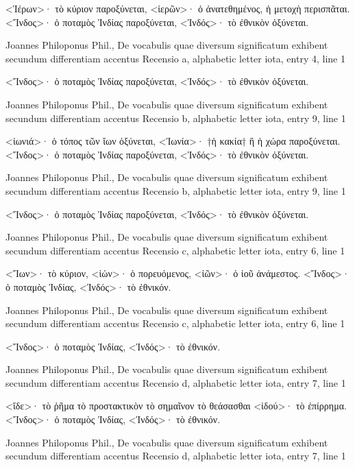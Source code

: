 \documentclass[12pt,letterpaper,twoside,final]{memoir}
\begin{document}
\begin{greek}
<Ἱέρων>· τὸ κύριον παροξύνεται, 
<ἱερῶν>· ὁ ἀνατεθημένος, ἡ μετοχὴ περισπᾶται. 
<Ἴνδος>· ὁ ποταμὸς Ἰνδίας παροξύνεται, 
<Ἰνδός>· τὸ ἐθνικὸν ὀξύνεται. 



Joannes Philoponus Phil., De vocabulis quae diversum significatum exhibent secundum differentiam accentus 
Recensio a, alphabetic letter iota, entry 4, line 1

<Ἴνδος>· ὁ ποταμὸς Ἰνδίας παροξύνεται, 
<Ἰνδός>· τὸ ἐθνικὸν ὀξύνεται. 



Joannes Philoponus Phil., De vocabulis quae diversum significatum exhibent secundum differentiam accentus 
Recensio b, alphabetic letter iota, entry 9, line 1

<ἰωνιά>· ὁ τόπος τῶν ἴων ὀξύνεται, 
<Ἰωνία>· †ἡ κακία† ἢ ἡ χώρα παροξύνεται. 
<Ἴνδος>· ὁ ποταμὸς Ἰνδίας παροξύνεται, 
<Ἰνδός>· τὸ ἐθνικὸν ὀξύνεται. 



Joannes Philoponus Phil., De vocabulis quae diversum significatum exhibent secundum differentiam accentus 
Recensio b, alphabetic letter iota, entry 9, line 1

<Ἴνδος>· ὁ ποταμὸς Ἰνδίας παροξύνεται, 
<Ἰνδός>· τὸ ἐθνικὸν ὀξύνεται. 



Joannes Philoponus Phil., De vocabulis quae diversum significatum exhibent secundum differentiam accentus 
Recensio c, alphabetic letter iota, entry 6, line 1

<Ἴων>· τὸ κύριον, 
<ἰών>· ὁ πορευόμενος, 
<ἰῶν>· ὁ ἰοῦ ἀνάμεστος. 
<Ἴνδος>· ὁ ποταμὸς Ἰνδίας, 
<Ἰνδός>· τὸ ἐθνικόν. 



Joannes Philoponus Phil., De vocabulis quae diversum significatum exhibent secundum differentiam accentus 
Recensio c, alphabetic letter iota, entry 6, line 1

<Ἴνδος>· ὁ ποταμὸς Ἰνδίας, 
<Ἰνδός>· τὸ ἐθνικόν. 



Joannes Philoponus Phil., De vocabulis quae diversum significatum exhibent secundum differentiam accentus 
Recensio d, alphabetic letter iota, entry 7, line 1

<ἴδε>· τὸ ῥῆμα τὸ προστακτικὸν τὸ σημαῖνον τὸ θεάσασθαι 
<ἰδού>· τὸ ἐπίρρημα. 
<Ἴνδος>· ὁ ποταμὸς Ἰνδίας, 
<Ἰνδός>· τὸ ἐθνικόν. 



Joannes Philoponus Phil., De vocabulis quae diversum significatum exhibent secundum differentiam accentus 
Recensio d, alphabetic letter iota, entry 7, line 1


\end{greek}
\end{document}
